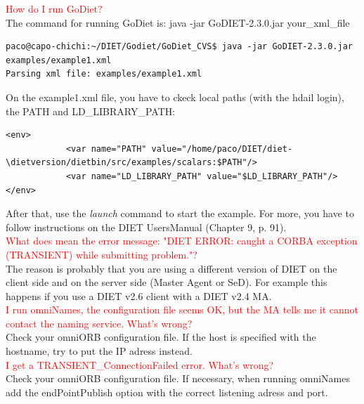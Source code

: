 \documentclass[12pt,a4paper]{book}
\newcommand{\dietversion}{2.5}
\begin{document}
\noindent \textcolor{red}{How do I run GoDiet?}\\
\noindent The command for running GoDiet is: java -jar GoDIET-2.3.0.jar your\_xml\_file
\begin{verbatim}
paco@capo-chichi:~/DIET/Godiet/GoDiet_CVS$ java -jar GoDIET-2.3.0.jar examples/example1.xml
Parsing xml file: examples/example1.xml
\end{verbatim}

\noindent On the example1.xml file, you have to ckeck local paths (with the hdail login), the PATH and LD\_LIBRARY\_PATH:

\begin{verbatim}
<env>
		    <var name="PATH" value="/home/paco/DIET/diet-\dietversion/dietbin/src/examples/scalars:$PATH"/>
		    <var name="LD_LIBRARY_PATH" value="$LD_LIBRARY_PATH"/>
</env>
\end{verbatim}

\noindent After that, use the \textit {launch} command to start the example. For more, you have to follow instructions on the DIET UsersManual (Chapter 9, p. 91).\\


\noindent \textcolor{red}{What does mean the error message: "DIET
  ERROR: caught a CORBA exception (TRANSIENT) while submitting
  problem."?}\\
\noindent The reason is probably that you are using a different
version of DIET on the client side and on the server side (Master Agent or
SeD). For example this happens if you use a DIET v2.6 client with
a DIET v2.4 MA.\\



\noindent \textcolor{red}{I run omniNames, the configuration file
  seems OK, but the MA tells me it cannot contact the naming
  service. What's wrong?}\\
\noindent Check your omniORB configuration file. If the host is
specified with the hostname, try to put the IP adress instead.\\


\noindent \textcolor{red}{I get a TRANSIENT\_ConnectionFailed error.
  What's wrong?}\\
\noindent Check your omniORB configuration file. If necessary, when
running omniNames add the endPointPublish option with the correct
listening adress and port.\\
\end{document}
